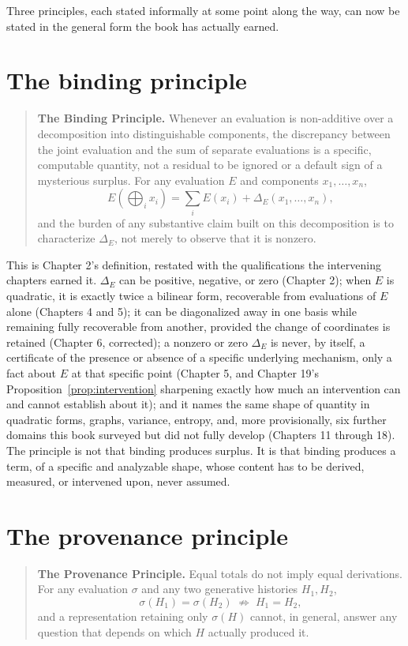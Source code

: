 \documentclass[11pt]{book}
\begin{document}
Three principles, each stated informally at some point along the way, can now be stated in the general form the book has actually earned.

\section{The binding principle}

\begin{quote}
\textbf{The Binding Principle.} Whenever an evaluation is non-additive over a decomposition into distinguishable components, the discrepancy between the joint evaluation and the sum of separate evaluations is a specific, computable quantity, not a residual to be ignored or a default sign of a mysterious surplus. For any evaluation $E$ and components $x_1,\ldots,x_n$,
\[
E\!\left(\bigoplus_ix_i\right) = \sum_iE(x_i) + \Delta_E(x_1,\ldots,x_n),
\]
and the burden of any substantive claim built on this decomposition is to characterize $\Delta_E$, not merely to observe that it is nonzero.
\end{quote}

This is Chapter 2's definition, restated with the qualifications the intervening chapters earned it. $\Delta_E$ can be positive, negative, or zero (Chapter 2); when $E$ is quadratic, it is exactly twice a bilinear form, recoverable from evaluations of $E$ alone (Chapters 4 and 5); it can be diagonalized away in one basis while remaining fully recoverable from another, provided the change of coordinates is retained (Chapter 6, corrected); a nonzero or zero $\Delta_E$ is never, by itself, a certificate of the presence or absence of a specific underlying mechanism, only a fact about $E$ at that specific point (Chapter 5, and Chapter 19's Proposition~\ref{prop:intervention} sharpening exactly how much an intervention can and cannot establish about it); and it names the same shape of quantity in quadratic forms, graphs, variance, entropy, and, more provisionally, six further domains this book surveyed but did not fully develop (Chapters 11 through 18). The principle is not that binding produces surplus. It is that binding produces a term, of a specific and analyzable shape, whose content has to be derived, measured, or intervened upon, never assumed.

\section{The provenance principle}

\begin{quote}
\textbf{The Provenance Principle.} Equal totals do not imply equal derivations. For any evaluation $\sigma$ and any two generative histories $H_1,H_2$,
\[
\sigma(H_1) = \sigma(H_2) \;\not\Longrightarrow\; H_1 = H_2,
\]
and a representation retaining only $\sigma(H)$ cannot, in general, answer any question that depends on which $H$ actually produced it.
\end{quote}
\end{document}
